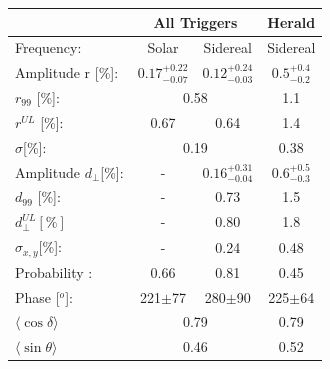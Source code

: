 \documentclass[12pt, doublespace, oneside]{article}
\begin{document}
\begin{table}[H]
    \vspace*{-0.1 cm}
    \begin{small}
        \begin{center}
            \begin{tabular}[c]{l|c|c||c|}
\cline{2-4}                                        & \multicolumn{2}{c||}{All Triggers}    & \multicolumn{1}{c|}{Herald  }   \\ \hline
\multicolumn{1}{|l|}{Frequency:                  } & Solar	                & Sidereal	                & Sidereal \cite{Aab_2020}   \\ \hline
\multicolumn{1}{|l|}{Amplitude r [\%]:           } & $0.17^{+0.22}_{-0.07}$	& $0.12^{+0.24}_{-0.03}$ 	& $0.5^{+0.4}_{-0.2}$ \cite{codigo}      \\
\multicolumn{1}{|l|}{$r_{99}$ [\%]:             } & \multicolumn{2}{c||}{0.58}                          & 1.1\cite{codigo}                 \\
\multicolumn{1}{|l|}{$r^{UL}$ [\%]:             } & 0.67 	                & 0.64                      & 1.4\cite{codigo}                 \\ 
\multicolumn{1}{|l|}{$\sigma$[\%]:              } & \multicolumn{2}{c||}{0.19}                          & 0.38\cite{codigo}       \\\hline
\multicolumn{1}{|l|}{Amplitude $d_\perp$[\%]:    } & -	                    & $0.16^{+0.31}_{-0.04}$ 	& $0.6^{+0.5}_{-0.3}$       \\
\multicolumn{1}{|l|}{$d_{99}$ [\%]:             } & - 	                    & 0.73                      & 1.5  \cite{codigo}                \\
\multicolumn{1}{|l|}{$d_{\perp}^{UL}[\%]$       } & -                       & 0.80                      & 1.8                         \\
\multicolumn{1}{|l|}{$\sigma_{x,y}$[\%]:        } & -	                    & 0.24	                    & 0.48       \\\hline
\multicolumn{1}{|l|}{Probability      :        } & 0.66                    & 0.81	                    & 0.45       \\
\multicolumn{1}{|l|}{Phase [$^o$]:                } & 221$\pm$77              & 280$\pm$90                & 225$\pm$64\\ \hline
\multicolumn{1}{|l|}{$\langle\cos\delta \rangle$} & \multicolumn{2}{c||}{0.79}        	                & 0.79 \cite{codigo}        \\        
\multicolumn{1}{|l|}{$\langle\sin\theta \rangle$} & \multicolumn{2}{c||}{0.46}        	                & 0.52 \cite{codigo}        \\ \hline       
            \end{tabular}
            

\end{center}
\end{small}
\end{table}
\end{document}
